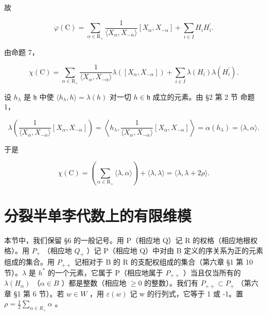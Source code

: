 故

\[
\varphi (\mathrm{C}) = \sum_ {\alpha \in \mathrm{R} _ {+}} \frac {1}{\langle X _ {\alpha} , X _ {- \alpha} \rangle} [ X _ {\alpha}, X _ {- \alpha} ] + \sum_ {i \in I} H _ {i} H _ {i} ^ {\prime}.
\]

由命题 7，

\[
\chi (\mathrm{C}) = \sum_ {\alpha \in \mathrm{R} _ {+}} \frac {1}{\langle X _ {\alpha} , X _ {- \alpha} \rangle} \lambda ([ X _ {\alpha}, X _ {- \alpha} ]) + \sum_ {i \in I} \lambda (H _ {i}) \lambda (H _ {i} ^ {\prime}).
\]

设 \(h_{\lambda}\) 是 \(\mathfrak{h}\) 中使 \(\langle h_{\lambda}, h \rangle = \lambda(h)\) 对一切 \(h \in \mathfrak{h}\) 成立的元素。由 §2 第 2 节 命题 1，

\[
\lambda \left(\frac {1}{\langle X _ {\alpha} , X _ {- \alpha} \rangle} [ X _ {\alpha}, X _ {- \alpha} ]\right) = \left\langle h _ {\lambda}, \frac {1}{\langle X _ {\alpha} , X _ {- \alpha} \rangle} [ X _ {\alpha}, X _ {- \alpha} ] \right\rangle = \alpha (h _ {\lambda}) = \langle \lambda , \alpha \rangle .
\]

于是

\[
\chi (\mathrm{C}) = \left(\sum_ {\alpha \in \mathrm{R} _ {+}} \langle \lambda , \alpha \rangle\right) + \langle \lambda , \lambda \rangle = \langle \lambda , \lambda + 2 \rho \rangle .
\]

\section{分裂半单李代数上的有限维模}

本节中，我们保留 §6 的一般记号。用 P（相应地 Q）记 R 的权格（相应地根权格）。用 \(P_{+}\) （相应地 \(Q_{+}\) ）记 P（相应地 Q）中对由 B 定义的序关系为正的元素组成的集合。用 \(P_{++}\) 记相对于 B 的 R 的支配权组成的集合（第六章 §1 第 10 节）。\(\lambda\) 是 \(h^{*}\) 的一个元素，它属于 P（相应地属于 \(P_{++}\) ）当且仅当所有的 \(\lambda(H_{\alpha})\) （\(\alpha \in B\) ）都是整数（相应地 \(\geq 0\) 的整数）。我们有 \(P_{++} \subset P_{+}\) （第六章 §1 第 6 节）。若 \(w \in W\) ，用 \(\varepsilon(w)\) 记 w 的行列式，它等于 1 或 -1。置 \(\rho = \frac{1}{2} \sum_{\alpha \in R_{+}} \alpha\) 。